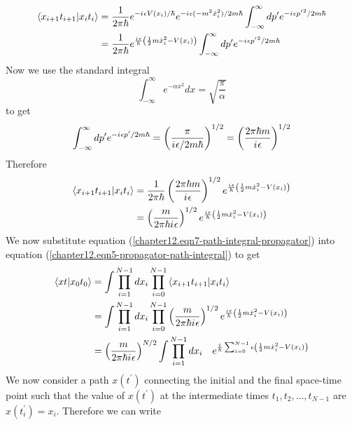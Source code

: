 \begin{enumerate}
	\begin{align}
		\braket{x_{i+1} t_{i+1}}{x_i t_i} 
		&= \frac{1}{2 \pi \hbar} e^{-{i\mkern1mu} \epsilon V(x_i)/\hbar} e^{-{i\mkern1mu} \epsilon (-m^2 \dot{x}_i^2) / 2 m \hbar}  \int_{-\infty}^{\infty} dp^\prime e^{-{i\mkern1mu} \epsilon {p^\prime}^2 / 2 m \hbar} \\
		&= \frac{1}{2 \pi \hbar} e^{\frac{{i\mkern1mu} \epsilon}{\hbar} \left(\frac{1}{2} m \dot{x}_i^2 - V(x_i)\right)} \int_{-\infty}^{\infty} dp^\prime e^{-{i\mkern1mu} \epsilon {p^\prime}^2 / 2 m \hbar}
	\end{align}
	Now we use the standard integral
	\begin{equation}
		\int_{-\infty}^{\infty} e^{-\alpha x^2} dx = \sqrt{\frac{\pi}{\alpha}}
	\end{equation}
	to get
	\begin{equation}
		\int_{-\infty}^{\infty} dp^\prime e^{-{i\mkern1mu} \epsilon p^\prime / 2 m \hbar} = \left(\frac{\pi}{{i\mkern1mu} \epsilon/2 m \hbar}\right)^{1/2} = \left(\frac{2 \pi \hbar m}{{i\mkern1mu} \epsilon}\right)^{1/2}
	\end{equation}
	Therefore
	\begin{align}
		\braket{x_{i+1} t_{i+1}}{x_i t_i} 
		&= \frac{1}{2 \pi \hbar} \left(\frac{2 \pi \hbar m}{{i\mkern1mu} \epsilon}\right)^{1/2} e^{\frac{{i\mkern1mu} \epsilon}{\hbar} \left(\frac{1}{2} m \dot{x}_i^2 - V(x_i)\right)} \\
		&= \left(\frac{m}{2\pi\hbar{i\mkern1mu} \epsilon}\right)^{1/2} e^{\frac{{i\mkern1mu} \epsilon}{\hbar} \left(\frac{1}{2} m \dot{x}_i^2 - V(x_i)\right)}
		\label{chapter12.eqn7-path-integral-propagator}
	\end{align}
	We now substitute equation (\ref{chapter12.eqn7-path-integral-propagator}) into equation (\ref{chapter12.eqn5-propagator-path-integral}) to get
	\begin{align}
		\braket{x t}{x_0 t_0} 
		&= \int \prod_{i=1}^{N-1} dx_i \prod_{i=0}^{N-1} \braket{x_{i+1} t_{i+1}}{x_i t_i}\\
		&= \int \prod_{i=1}^{N-1} dx_i \prod_{i=0}^{N-1} \left(\frac{m}{2 \pi \hbar {i\mkern1mu} \epsilon}\right)^{1/2} e^{\frac{{i\mkern1mu} \epsilon}{\hbar} \left(\frac{1}{2} m \dot{x}_i^2 - V(x_i)\right)} \\
		&= \left(\frac{m}{2 \pi \hbar {i\mkern1mu} \epsilon}\right)^{N/2} \int \prod_{i=1}^{N-1} dx_i \quad e^{\frac{{i\mkern1mu}}{\hbar} \sum_{i=0}^{N-1} \epsilon \left(\frac{1}{2} m \dot{x}_i^2 - V(x_i)\right)}
		\label{chapter12.eqn8-path-integral-propagator}
	\end{align}
	We now consider a path $x(t^\prime)$ connecting the initial and the final space-time point such that the value of $x(t^\prime)$ at the intermediate times $t_1, t_2, \ldots, t_{N-1}$ are $x(t_i^\prime)=x_i$. Therefore we can write

\end{enumerate}
